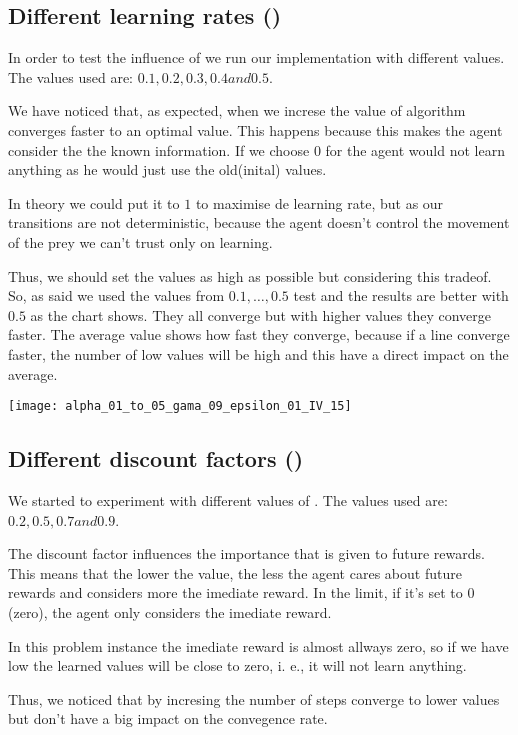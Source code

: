 \documentclass{article}
\begin{document}
\subsection{Different learning rates (\alpha)}
In order to test the influence of \alpha we run our implementation with
different values. The values used are:
$0.1 , 0.2, 0.3, 0.4 and 0.5$. 

We have noticed that, as expected, when we increse the value of \alpha algorithm
converges faster to an optimal value. This happens because this makes the agent
consider the the known information. If we choose $0$ for \alpha the agent would
not learn anything as he would just use the old(inital) values.

In theory we could put it to $1$ to maximise de learning rate, but as our
transitions are not deterministic, because the agent doesn't control the
movement of the prey we can't trust only on learning.

Thus, we should set the values as high as possible but considering this tradeof.
So, as said we used the values from $0.1, \ldots , 0.5$ test and the results are
better with $0.5$ as the chart shows. They all converge but with higher values
they converge faster. The average value shows how fast they converge, because if
a line converge faster, the number of low values will be high and this have a
direct impact on the average.

\texttt{[image: alpha\_01\_to\_05\_gama\_09\_epsilon\_01\_IV\_15]}

\subsection{Different discount factors (\gamma)}
We started to experiment with different values of \gamma. The values used are:
$0.2, 0.5, 0.7 and 0.9$. 

The discount factor influences the importance that is given to future rewards.
This means that the lower the value, the less the agent cares about future
rewards and considers more the imediate reward. In the limit, if it's set to
$0$ (zero), the agent only considers the imediate reward.

In this problem instance the imediate reward is almost allways zero, so if we
have low \gamma the learned values will be close to zero, i. e., it will not
learn anything. 

Thus, we noticed that by incresing \gamma the number of steps converge to lower
values but don't have a big impact on the convegence rate.
\end{document}
